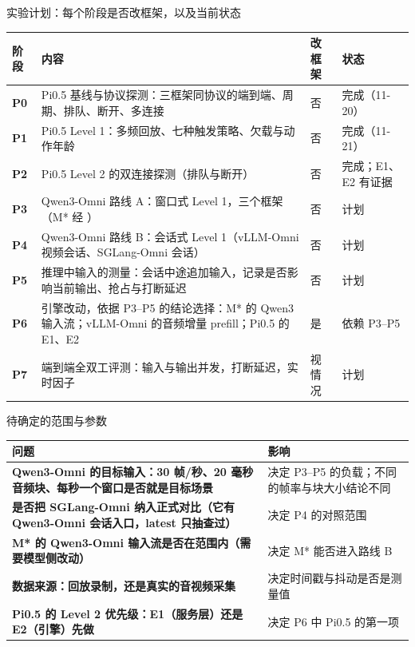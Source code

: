 
\begin{frame}[t]{实验计划：每个阶段是否改框架，以及当前状态}
\scriptsize
\renewcommand{\arraystretch}{1.08}
\setlength{\tabcolsep}{3pt}
\begin{tabularx}{\textwidth}{>{\bfseries}p{1.2cm} Y p{1.1cm} p{2.5cm}}
\toprule
{}
阶段 & 内容 & 改框架 & 状态 \\
\midrule
P0 & Pi0.5 基线与协议探测：三框架同协议的端到端、周期、排队、断开、多连接 & 否 & 完成（11-20） \\
P1 & Pi0.5 Level 1：多频回放、七种触发策略、欠载与动作年龄 & 否 & 完成（11-21） \\
P2 & Pi0.5 Level 2 的双连接探测（排队与断开） & 否 & 完成；E1、E2 有证据 \\
P3 & Qwen3-Omni 路线 A：窗口式 Level 1，三个框架（M* 经 ） & 否 & 计划 \\
P4 & Qwen3-Omni 路线 B：会话式 Level 1（vLLM-Omni 视频会话、SGLang-Omni 会话） & 否 & 计划 \\
P5 & 推理中输入的测量：会话中途追加输入，记录是否影响当前输出、抢占与打断延迟 & 否 & 计划 \\
P6 & 引擎改动，依据 P3–P5 的结论选择：M* 的 Qwen3 输入流；vLLM-Omni 的音频增量 prefill；Pi0.5 的 E1、E2 & 是 & 依赖 P3–P5 \\
P7 & 端到端全双工评测：输入与输出并发，打断延迟，实时因子 & 视情况 & 计划 \\
\bottomrule
\end{tabularx}
\par{}
\end{frame}

\begin{frame}[t]{待确定的范围与参数}
\scriptsize
\renewcommand{\arraystretch}{1.12}
\setlength{\tabcolsep}{3pt}
\begin{tabularx}{\textwidth}{>{\bfseries}p{2.6cm} Y}
\toprule
{}
问题 & 影响 \\
\midrule
Qwen3-Omni 的目标输入：30 帧/秒、20 毫秒音频块、每秒一个窗口是否就是目标场景 & 决定 P3--P5 的负载；不同的帧率与块大小结论不同 \\
是否把 SGLang-Omni 纳入正式对比（它有 Qwen3-Omni 会话入口，latest 只抽查过） & 决定 P4 的对照范围 \\
M* 的 Qwen3-Omni 输入流是否在范围内（需要模型侧改动） & 决定 M* 能否进入路线 B \\
数据来源：回放录制，还是真实的音视频采集 & 决定时间戳与抖动是否是测量值 \\
Pi0.5 的 Level 2 优先级：E1（服务层）还是 E2（引擎）先做 & 决定 P6 中 Pi0.5 的第一项 \\
\bottomrule
\end{tabularx}
\par{}
\end{frame}
